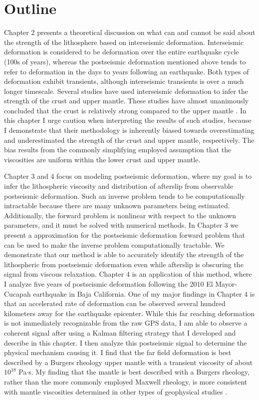 \section{Outline}
Chapter 2 presents a theoretical discussion on what can and cannot be
said about the strength of the lithosphere based on interseismic
deformation. Interseismic deformation is considered to be deformation
over the entire earthquake cycle (100s of years), whereas the
postseismic deformation mentioned above tends to refer to deformation
in the days to years following an earthquake. Both types of
deformation exhibit transients, although interseismic transients is
over a much longer timescale. Several studies have used interseismic
deformation to infer the strength of the crust and upper mantle. These
studies have almost unanimously concluded that the crust is relatively
strong compared to the upper mantle \citep{Thatcher2008}. In this
chapter I urge caution when interpreting the results of such studies,
because I demonstrate that their methodology is inherently biased
towards overestimating and underestimated the strength of the crust
and upper mantle, respectively. The bias results from the commonly
simplifying employed assumption that the viscosities are uniform
within the lower crust and upper mantle.

Chapter 3 and 4 focus on modeling postseismic deformation, where my
goal is to infer the lithospheric viscosity and distribution of
afterslip from observable postseismic deformation. Such an inverse
problem tends to be computationally intractable because there are many
unknown parameters being estimated. Additionally, the forward problem
is nonlinear with respect to the unknown parameters, and it must be
solved with numerical methods. In Chapter 3 we present a approximation
for the postseismic deformation forward problem that can be used to
make the inverse problem computationally tractable. We demonstrate
that our method is able to accurately identify the strength of the
lithospheric from postseismic deformation even while afterslip is
obscuring the signal from viscous relaxation. Chapter 4 is an
application of this method, where I analyze five years of postseismic
deformation following the 2010 El Mayor-Cucapah earthquake in Baja
California. One of my major findings in Chapter 4 is that an
accelerated rate of deformation can be observed several hundred
kilometers away for the earthquake epicenter. While this far reaching
deformation is not immediately recognizable from the raw GPS data, I
am able to observe a coherent signal after using a Kalman filtering
strategy that I developed and describe in this chapter. I then analyze
this postseismic signal to determine the physical mechanism causing
it. I find that the far field deformation is best described by a
Burgers rheology upper mantle with a transient viscosity of about
$10^{18}$ Pa$\cdot$s. My finding that the mantle is best described
with a Burgers rheology, rather than the more commonly employed
Maxwell rheology, is more consistent with mantle viscosities
determined in other types of geophysical studies
\citep[e.g.,][]{Crittenden1967,Bills1987}.

